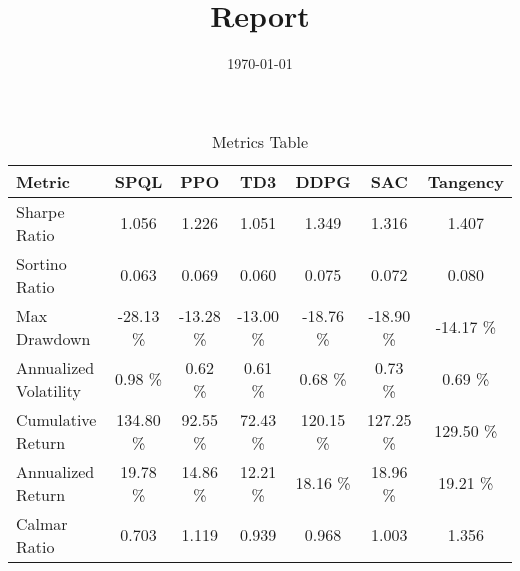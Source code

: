 \documentclass[a4paper,
        fleqn,            %
        12pt,             %
        ngerman,          %
        oneside,          %
        chapterentrydots=true,  %
        parskip=half      %
        ]{article}
\begin{document}
    \title{Report}
    \date{\today}
    \maketitle
    \newpage
    \tableofcontents
    \newpage
    
    \begin{figure}[H]
        \centering
        
        \caption{}
        \label{fig:portfolio_value_paper}
    \end{figure}
    

    \begin{figure}[H]
        \centering
        
        \caption{}
        \label{fig:portfolio_value_beamer}
    \end{figure}
    
\begin{table}[H]
\centering
\begin{tabular}{lcccccc}
\toprule
Metric & SPQL & PPO & TD3 & DDPG & SAC & Tangency \\
\midrule
Sharpe Ratio & 1.056 & 1.226 & 1.051 & 1.349 & 1.316 & 1.407 \\
Sortino Ratio & 0.063 & 0.069 & 0.060 & 0.075 & 0.072 & 0.080 \\
Max Drawdown & -28.13 \% & -13.28 \% & -13.00 \% & -18.76 \% & -18.90 \% & -14.17 \% \\
Annualized Volatility & 0.98 \% & 0.62 \% & 0.61 \% & 0.68 \% & 0.73 \% & 0.69 \% \\
Cumulative Return & 134.80 \% & 92.55 \% & 72.43 \% & 120.15 \% & 127.25 \% & 129.50 \% \\
Annualized Return & 19.78 \% & 14.86 \% & 12.21 \% & 18.16 \% & 18.96 \% & 19.21 \% \\
Calmar Ratio & 0.703 & 1.119 & 0.939 & 0.968 & 1.003 & 1.356 \\
\bottomrule
\end{tabular}
\caption{Metrics Table}
\label{tab:metrics_table}
\end{table}
    
\end{document}

